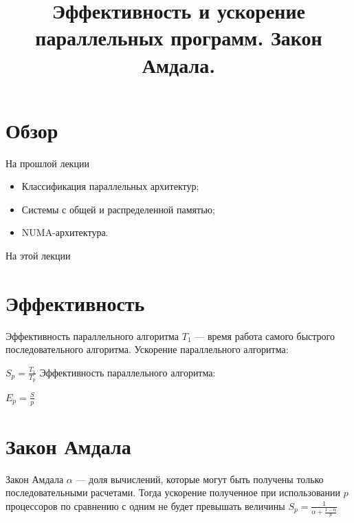 

\title{Эффективность и ускорение параллельных программ. Закон Амдала.}



\begin{frame}
\titlepage
\end{frame}

\section*{Обзор}

\begin{frame}{На прошлой лекции}
\begin{itemize}
    \item Классификация параллельных архитектур;
    \item Системы с общей и распределенной памятью;
    \item NUMA-архитектура.
\end{itemize}
\end{frame}

\begin{frame}{На этой лекции}
\tableofcontents
\end{frame}

\section{Эффективность}

\begin{frame}{Эффективность параллельного алгоритма}
$T_1$ --- время работа самого быстрого последовательного алгоритма.
\vfill
Ускорение параллельного алгоритма:

$S_p = \frac{T_1}{T_p}$
\vfill
Эффективность параллельного алгоритма:

$E_p = \frac{S}{p}$
\end{frame}

\section{Закон Амдала}

\begin{frame}{Закон Амдала}
$\alpha$ --- доля вычислений, которые могут быть получены только
последовательными расчетами.
\vfill
Тогда ускорение полученное при использовании $p$ процессоров по сравнению с
одним не будет превышать величины
\vfill
$S_p =\frac{1}{\alpha + \frac{1 - \alpha}{p}}$
\end{frame}

